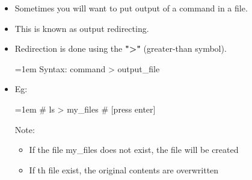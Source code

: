 \setlength{\columnsep}{3pt}
\begin{flushleft}
	\begin{itemize}
		\item Sometimes you will want to put output of a command in a file.
		\item This is known as output redirecting.
		\item Redirection is done using the \textbf{">"} (greater-than symbol).
		\bigskip
		\begin{tcolorbox}[breakable,notitle,boxrule=-0pt,colback=pink,colframe=pink]
			\color{black}
			\font=1em
			Syntax: command > output\_file
			\font=4pt
		\end{tcolorbox}
		\item Eg:
		\bigskip
		\begin{tcolorbox}[breakable,notitle,boxrule=-0pt,colback=black,colframe=black]
			\color{green}
			\font=1em
			\# ls > my\_files 			\color{yellow} # [press enter]
			\font=4pt
		\end{tcolorbox}
		
		\bigskip
		
		\begin{tcolorbox}[breakable,notitle,boxrule=1pt,colback=yellow,colframe=yellow]
			\color{black}
			Note: 
			\begin{itemize}
				\item If the file my\_files does not exist, the file will be created
				\item If th file exist, the original contents are overwritten
			\end{itemize}
		\end{tcolorbox}
	\end{itemize}

\end{flushleft}


